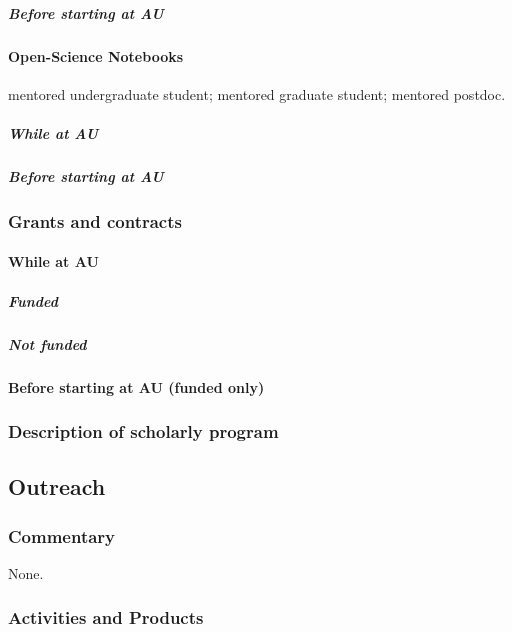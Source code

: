\subparagraph*{Before starting at AU}


\paragraph{Open-Science Notebooks}
\ugsymbol{}mentored undergraduate student;
\phdsymbol{}mentored graduate student;
\postdocsymbol{}mentored postdoc.
\subparagraph{While at AU}
\nocite{*}
\printbibliography[filter=openscinotebooks, check=afteraustart, heading=none]

\subparagraph{Before starting at AU}
\nocite{*}
\printbibliography[filter=openscinotebooks, check=beforeaustart, heading=none]

\subsubsection{Grants and contracts}

\paragraph{While at AU}
\subparagraph*{Funded}


\subparagraph{Not funded}


\paragraph{Before starting at AU (funded only)}


\subsubsection{Description of scholarly program}


\subsection{Outreach}

\subsubsection{Commentary}
None.

\subsubsection{Activities and Products}

